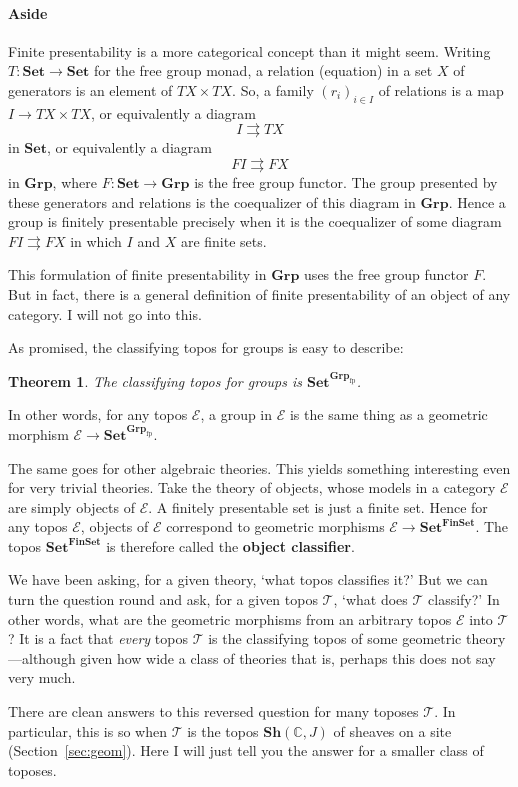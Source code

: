\documentclass{article}
\newcommand{\cat}[1]{\mathscr{#1}}
\newcommand{\fcat}[1]{\mathbf{#1}}
\newcommand{\Set}{\fcat{Set}}
\newcommand{\parpairu}{\rightrightarrows}
\newcommand{\demph}[1]{\textbf{\textup{#1}}}
\newcommand{\scat}[1]{\mathbb{#1}}
\newcommand{\E}{\cat{E}}
\newcommand{\T}{\cat{T}}
\newcommand{\Sh}{\fcat{Sh}}
\newcommand{\FinSet}{\fcat{FinSet}}
\newcommand{\fp}{\mathrm{fp}}
\newcommand{\Gp}{\fcat{Grp}}
\newcommand{\cln}{\colon}
\newtheorem{thm}{Theorem}[section]
\begin{document}
\paragraph*{Aside} Finite presentability is a more categorical concept than it
might seem.  Writing $T\cln \Set \to \Set$ for the free group monad, a relation
(equation) in a set $X$ of generators is an element of $TX \times TX$.  So, a
family $(r_i)_{i \in I}$ of relations is a map $I \to TX \times TX$, or
equivalently a diagram 
\[
I \parpairu TX
\]
in $\Set$, or equivalently a diagram 
\[
FI \parpairu FX
\]
in $\Gp$, where $F\cln \Set \to \Gp$ is the free group functor.  The group
presented by these generators and relations is the coequalizer of this diagram
in $\Gp$.  Hence a group is finitely presentable precisely when it is the
coequalizer of some diagram $FI \parpairu FX$ in which $I$ and $X$ are finite
sets.  

This formulation of finite presentability in $\Gp$ uses the free group functor
$F$.  But in fact, there is a general definition of finite presentability of
an object of any category.  I will not go into this.

\bigskip

As promised, the classifying topos for groups is easy to describe:
% 
\begin{thm}
The classifying topos for groups is $\Set^{\Gp_\fp}$.
\end{thm}
% 
In other words, for any topos $\E$, a group in $\E$ is the same thing as a
geometric morphism $\E \to \Set^{\Gp_\fp}$.  

The same goes for other algebraic theories.  This yields something
interesting even for very trivial theories.  Take the theory of objects, whose
models in a category $\E$ are simply objects of $\E$.  A finitely presentable
set is just a finite set.  Hence for any topos $\E$, objects of $\E$
correspond to geometric morphisms $\E \to \Set^{\FinSet}$.  The topos
$\Set^\FinSet$ is therefore called the \demph{object classifier}.

We have been asking, for a given theory, `what topos classifies it?'  But we
can turn the question round and ask, for a given topos $\T$, `what does $\T$
classify?'  In other words, what are the geometric morphisms from an arbitrary
topos $\E$ into $\T$?  It is a fact that \emph{every} topos $\T$ is the
classifying topos of some geometric theory---although given how wide a class
of theories that is, perhaps this does not say very much.

There are clean answers to this reversed question for many toposes $\T$.  In
particular, this is so when $\T$ is the topos $\Sh(\scat{C}, J)$ of sheaves on
a site (Section~\ref{sec:geom}).  Here I will just tell you the answer for a
smaller class of toposes.
\end{document}
